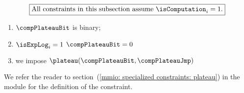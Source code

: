 \[
    \boxed{\text{All constraints in this subsection assume } \isComputation _{i} = 1.}
\]

\begin{enumerate}
    \item $\compPlateauBit$ is binary;
    \item \If $\isExpLog   _{i} = 1$ \Then $\compPlateauBit = 0$
    \item we impose $\plateau( \compPlateauBit, \compPlateauJmp)$
\end{enumerate}
We refer the reader to section~(\ref{mmio: specialized constraints: plateau}) in the \mmioMod{} module for the definition of the \plateau{} constraint.
